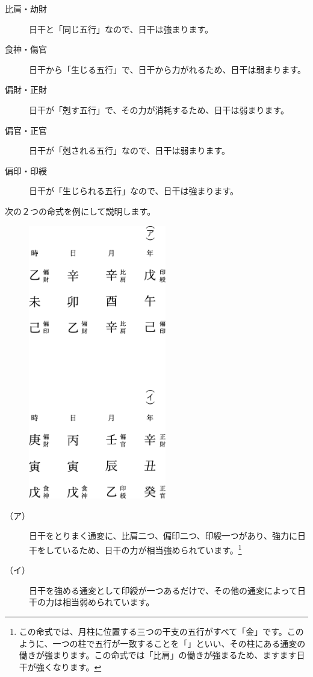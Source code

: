\documentclass[a5paper,11pt,dvipdfmx]{tarticle}
\begin{document}
\begin{description}
\item[比肩・劫財] 日干と「同じ五行」なので、日干は強まります。
\item[食神・傷官] 日干から「生じる五行」で、日干から力がれるため、日干は弱まります。
\item[偏財・正財] 日干が「剋す五行」で、その力が消耗するため、日干は弱まります。
\item[偏官・正官] 日干が「剋される五行」なので、日干は弱まります。
\item[偏印・印綬] 日干が「生じられる五行」なので、日干は強まります。
\end{description}

次の２つの命式を例にして説明します。

\begin{figure}[h]
  \includegraphics[width=60mm,angle=90]{figs/figure6-6.eps}
\end{figure}

\begin{description}
 \item[（ア）] 日干をとりまく通変に、比肩二つ、偏印二つ、印綬一つがあり、強力に日干をしているため、日干の力が相当強められています。\footnote{この命式では、月柱に位置する三つの干支の五行がすべて「金」です。このように、一つの柱で五行が一致することを「」といい、その柱にある通変の働きが強まります。この命式では「比肩」の働きが強まるため、ますます日干が強くなります。}
 \item[（イ）] 日干を強める通変として印綬が一つあるだけで、その他の通変によって日干の力は相当弱められています。
\end{description}
\end{document}
